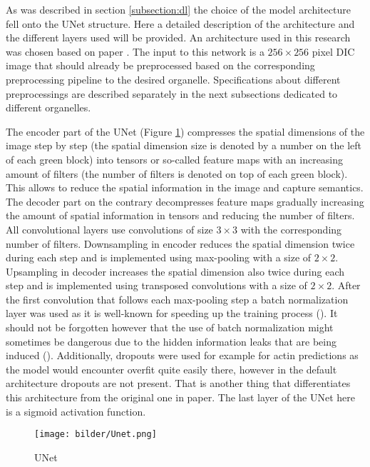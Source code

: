 As was described in section \ref{subsection:dl} the choice of the model architecture fell onto the UNet structure. Here a detailed description of the architecture and the different layers used will be provided. An architecture used in this research was chosen based on paper \cite{Lachance_2020}. The input to this network is a $256 \times 256$ pixel DIC image that should already be preprocessed based on the corresponding preprocessing pipeline to the desired organelle. Specifications about different preprocessings are described separately in the next subsections dedicated to different organelles.

The encoder part of the UNet (Figure \ref{fig:unet}) compresses the spatial dimensions of the image step by step (the spatial dimension size is denoted by a number on the left of each green block) into tensors or so-called feature maps with an increasing amount of filters (the number of filters is denoted on top of each green block). This allows to reduce the spatial information in the image and capture semantics. The decoder part on the contrary decompresses feature maps gradually increasing the amount of spatial information in tensors and reducing the number of filters. All convolutional layers use convolutions of size $3 \times 3$ with the corresponding number of filters. Downsampling in encoder reduces the spatial dimension twice during each step and is implemented using max-pooling with a size of $2 \times 2$. Upsampling in decoder increases the spatial dimension also twice during each step and is implemented using transposed convolutions with a size of $2 \times 2$. After the first convolution that follows each max-pooling step a batch normalization layer was used as it is well-known for speeding up the training process (\cite{Ioffe_2015}). It should not be forgotten however that the use of batch normalization might sometimes be dangerous due to the hidden information leaks that are being induced (\cite{fetterman}). Additionally, dropouts were used for example for actin predictions as the model would encounter overfit quite easily there, however in the default architecture dropouts are not present. That is another thing that differentiates this architecture from the original one in \cite{Lachance_2020} paper. The last layer of the UNet here is a sigmoid activation function.
\begin{figure}[htb]
	\begin{center}
		\texttt{[image: bilder/Unet.png]}
		\caption{UNet}\label{fig:unet}
	\end{center}
\end{figure}


